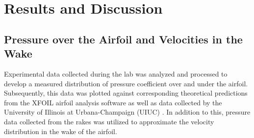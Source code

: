 \documentclass[11pt, letterpaper]{article}
\begin{document}
\section{Results and Discussion}

\subsection{Pressure over the Airfoil and Velocities in the Wake}

Experimental data collected during the lab was analyzed and processed to develop a measured distribution of pressure coefficient over and under the airfoil. Subsequently, this data was plotted against corresponding theoretical predictions from the XFOIL airfoil analysis software as well as data collected by the University of Illinois at Urbana-Champaign (UIUC) \cite{UIUC}. In addition to this, pressure data collected from the rakes was utilized to approximate the velocity distribution in the wake of the airfoil.
\end{document}
